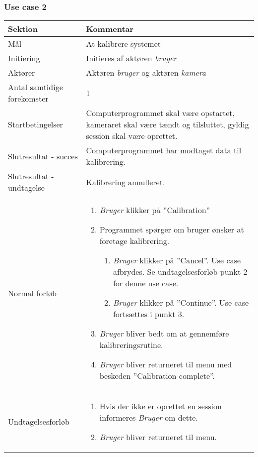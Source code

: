 \documentclass[rapport.tex]{subfiles}
\begin{document}
		\subsubsection{Use case 2}
		\begin{tabular}{|l|p{7.7cm}|}
			\hline \textbf{Sektion} & \textbf{Kommentar} \\ 
			\hline Mål & At kalibrere systemet \\ 
			\hline Initiering & Initieres af aktøren \textit{bruger} \\ 
			\hline Aktører & Aktøren \textit{bruger} og aktøren \textit{kamera} \\ 
			\hline Antal samtidige forekomster & 1 \\ 
			\hline Startbetingelser & Computerprogrammet skal være opstartet, kameraret skal være tændt og tilsluttet, gyldig session skal være oprettet. \\ 	
			\hline Slutresultat - succes & Computerprogrammet har modtaget data til kalibrering. \\ 
			\hline Slutresultat - undtagelse &  Kalibrering annulleret. \\ 
			\hline Normal forløb & \begin{enumerate}
				\item \textit{Bruger} klikker på ”Calibration”
				\item Programmet spørger om bruger ønsker at foretage kalibrering.
				\begin{enumerate}
					\item \textit{Bruger} klikker på ”Cancel”.
					Use case afbrydes.
					Se undtagelsesforløb punkt 2 for denne use case.
					\item \textit{Bruger} klikker på ”Continue”. 
					Use case fortsættes i punkt 3.
				\end{enumerate}
				\item \textit{Bruger} bliver bedt om at gennemføre kalibreringsrutine.
				\item \textit{Bruger} bliver returneret til menu med beskeden ”Calibration complete”.
				
			\end{enumerate} \\ 
			\hline Undtagelsesforløb & \begin{enumerate}
				\item Hvis der ikke er oprettet en session informeres \textit{Bruger} om dette.
				\item \textit{Bruger} bliver returneret til menu.
			\end{enumerate}  \\ 
			\hline 
		\end{tabular} \\ \\
\end{document}
